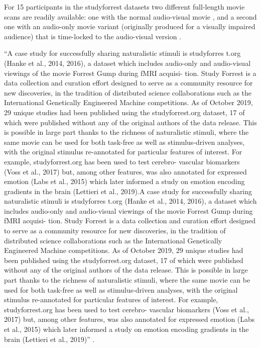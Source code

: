 For 15 participants in the studyforrest datasets two different full-length movie
scans are readily available: one with the normal audio-visual movie
\citep{hanke2016simultaneous}, and a second one with an audio-only movie variant
(originally produced for a visually impaired audience) that is time-locked to
the audio-visual version \citep{hanke2014audiomovie}.

``A case study for successfully sharing naturalistic stimuli is studyforres t.org
(Hanke et al., 2014, 2016), a dataset which includes audio-only and audio-visual
viewings of the movie Forrest Gump during fMRI acquisi- tion. Study Forrest is a
data collection and curation effort designed to serve as a community resource
for new discoveries, in the tradition of distributed science collaborations such
as the International Genetically Engineered Machine competitions. As of October
2019, 29 unique studies had been published using the studyforrest.org dataset,
17 of which were published without any of the original authors of the data
release. This is possible in large part thanks to the richness of naturalistic
stimuli, where the same movie can be used for both task-free as well as
stimulus-driven analyses, with the original stimulus re-annotated for particular
features of interest. For example, studyforrest.org has been used to test
cerebro- vascular biomarkers (Voss et al., 2017) but, among other features, was
also annotated for expressed emotion (Labs et al., 2015) which later informed a
study on emotion encoding gradients in the brain (Lettieri et al., 2019).A case
study for successfully sharing naturalistic stimuli is studyforres t.org (Hanke
et al., 2014, 2016), a dataset which includes audio-only and audio-visual
viewings of the movie Forrest Gump during fMRI acquisi- tion. Study Forrest is a
data collection and curation effort designed to serve as a community resource
for new discoveries, in the tradition of distributed science collaborations such
as the International Genetically Engineered Machine competitions. As of October
2019, 29 unique studies had been published using the studyforrest.org dataset,
17 of which were published without any of the original authors of the data
release. This is possible in large part thanks to the richness of naturalistic
stimuli, where the same movie can be used for both task-free as well as
stimulus-driven analyses, with the original stimulus re-annotated for particular
features of interest. For example, studyforrest.org has been used to test
cerebro- vascular biomarkers (Voss et al., 2017) but, among other features, was
also annotated for expressed emotion (Labs et al., 2015) which later informed a
study on emotion encoding gradients in the brain (Lettieri et al., 2019)''
\citep{dupre2020nature}.


